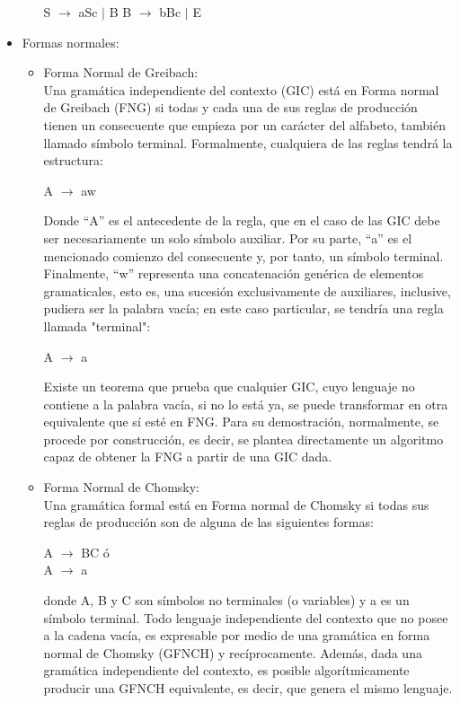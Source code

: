 \documentclass[12pt,a4paper,spanish]{book}
\begin{document}
\begin{itemize}
\begin{enumerate}
    S  $\rightarrow$ aSc $\mid$ B
    B $\rightarrow$ bBc $\mid$ E\\
\end{enumerate}
\item Formas normales:
\begin{itemize}
\item Forma Normal de Greibach:\\
\newline
Una gram\'atica independiente del contexto (GIC) est\'a en Forma normal de Greibach (FNG) si todas y cada una de sus reglas de producci\'on tienen un consecuente que empieza por un car\'acter del alfabeto, tambi\'en llamado s\'imbolo terminal. Formalmente, cualquiera de las reglas tendr\'a la estructura:\\
\begin{center}
A $\rightarrow$ aw
\end{center}
Donde ``A'' es el antecedente de la regla, que en el caso de las GIC debe ser necesariamente un solo s\'imbolo auxiliar. Por su parte, ``a'' es el mencionado comienzo del consecuente y, por tanto, un s\'imbolo terminal. Finalmente, ``w'' representa una concatenaci\'on gen\'erica de elementos gramaticales, esto es, una sucesi\'on exclusivamente de auxiliares, inclusive, pudiera ser la palabra vac\'ia; en este caso particular, se tendr\'ia una regla llamada "terminal":\\
\begin{center}
A $\rightarrow$ a
\end{center}
Existe un teorema que prueba que cualquier GIC, cuyo lenguaje no contiene a la palabra vac\'ia, si no lo est\'a ya, se puede transformar en otra equivalente que s\'i est\'e en FNG. Para su demostraci\'on, normalmente, se procede por construcci\'on, es decir, se plantea directamente un algoritmo capaz de obtener la FNG a partir de una GIC dada.\\
\item Forma Normal de Chomsky:\\
\newline
Una gram\'atica formal est\'a en Forma normal de Chomsky si todas sus reglas de producci\'on son de alguna de las siguientes formas:
\begin{center}
A $\rightarrow$ BC \'o\\ 
A $\rightarrow$ a\\
\end{center}
donde A, B y C son s\'imbolos no terminales (o variables) y a es un s\'imbolo terminal.
Todo lenguaje independiente del contexto que no posee a la cadena vac\'ia, es expresable por medio de una gram\'atica en forma normal de Chomsky (GFNCH) y rec\'iprocamente. Adem\'as, dada una gram\'atica independiente del contexto, es posible algor\'itmicamente producir una GFNCH equivalente, es decir, que genera el mismo lenguaje.
\end{itemize}
\end{itemize}
\end{document}
